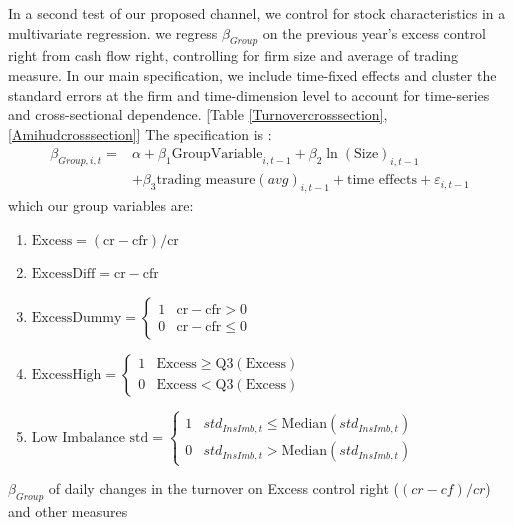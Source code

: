\documentclass[12pt, a4paper]{article}
\begin{document}
In a second test of our proposed channel, we control for stock  characteristics in a multivariate regression. we regress $ \beta_{Group} $
on the previous year's excess control right from cash flow right, controlling for firm size and average of trading measure. In our main
specification, we include time-fixed effects and cluster the standard errors at the firm and time-dimension level to account for time-series and cross-sectional dependence. [Table \ref{Turnovercrosssection},\ref{Amihudcrosssection}]  The specification is :
\begin{equation*}
	\begin{split}
		\beta_{Group,i,t} =& \alpha + \beta_1 \text{GroupVariable}_{i,t-1} + \beta_2 \ln(\text{Size})_{i,t-1} \\
		&+ \beta_3 \text{trading measure}(avg)_{i,t-1} + \text{time effects} + \varepsilon_{i,t-1}
	\end{split}
\end{equation*}
which our group variables are:
	\begin{enumerate}
	\item $ \text{Excess} = (\text{cr} - \text{cfr})/\text{cr} $
	\item $ \text{ExcessDiff} = \text{cr} - \text{cfr} $
	\item $ \text{ExcessDummy} = \left\{\begin{array}{ll}
		1 & \text{cr} - \text{cfr}>0\\
		0 & \text{cr} - \text{cfr}\leq 0
	\end{array}\right.  $
	\item $ \text{ExcessHigh} = \left\{\begin{array}{ll}
		1 & \text{Excess}\geq\text{Q3}(\text{Excess})\\
		0 & \text{Excess}<\text{Q3}(\text{Excess})
	\end{array}\right.  $
\item $ \text{Low Imbalance std} = \left\{\begin{array}{ll}
	1 & std_{InsImb,t}\leq\text{Median}(std_{InsImb,t})\\
	0 & std_{InsImb,t}>\text{Median}(std_{InsImb,t})
\end{array}\right.  $

\end{enumerate}



	\begin{table}[htbp]
	\centering
	\caption{$ \beta_{Group} $ of daily changes in the turnover on Excess control right ($ (cr - cf)/cr $) and other measures   }
	\resizebox{0.7\textheight}{!}{
		\centering
		
	}
\label{Turnovercrosssection}
\end{table}
\end{document}
